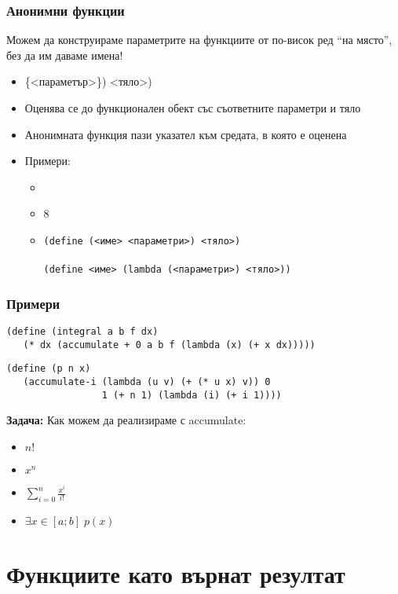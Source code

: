 \documentclass{beamer}
\begin{document}
\begin{frame}
  \frametitle{Анонимни функции}

  Можем да конструираме параметрите на функциите от по-висок ред ``на място'', без да им даваме имена!\\[0.5em]
  \pause
  \begin{itemize}[<+->]
  \item {}\{<параметър>\}\tta) <тяло>\tta)
  \item Оценява се до функционален обект със съответните параметри и тяло
  \item \alert{Анонимната функция пази указател към средата, в която е оценена}
  \item Примери:
    \begin{itemize}
    \item {}
    \item {}8
    \item
        \tt{(define (}<име> <параметри>\tt) <тяло>\tt)\\
        \eqv\\
        \tt{(define }<име> \tt{(lambda (}<параметри>\tt) <тяло>\tt{))}
    \end{itemize}
  \end{itemize}
\end{frame}

\begin{frame}[fragile]
  \frametitle{Примери}

\begin{lstlisting}
(define (integral a b f dx)
   (* dx (accumulate + 0 a b f (lambda (x) (+ x dx)))))
\end{lstlisting}
\pause
\begin{lstlisting}
(define (p n x)
   (accumulate-i (lambda (u v) (+ (* u x) v)) 0
                 1 (+ n 1) (lambda (i) (+ i 1))))
\end{lstlisting}
\pause
\textbf{Задача:} Как можем да реализираме с accumulate:
\begin{itemize}[<+->]
\item $n!$
\item $x^n$
\item $\sum_{i=0}^n \frac{x^i}{i!}$
\item $\exists x\in[a;b]\; p(x)$
\end{itemize}
\end{frame}

\section{Функциите като върнат резултат}
\end{document}
